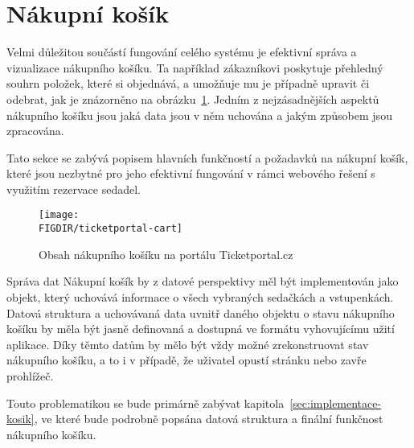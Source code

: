 \section{Nákupní košík}
\label{sec:identifikace-nakupni-kosik}
Velmi důležitou součástí fungování celého systému je efektivní správa a vizualizace nákupního košíku.
Ta například zákazníkovi poskytuje přehledný souhrn položek, které si objednává, a umožňuje mu je případně upravit či odebrat, jak je znázorněno na obrázku~\ref{fig:ticketportal-cart}.
Jedním z nejzásadnějších aspektů nákupního košíku jsou jaká data jsou v něm uchována a jakým způsobem jsou zpracována.

Tato sekce se zabývá popisem hlavních funkčností a požadavků na nákupní košík, které jsou nezbytné pro jeho efektivní fungování v rámci webového řešení s využitím rezervace sedadel.

\begin{figure}[H]
    \texttt{[image: \\FIGDIR/ticketportal-cart]}
    \centering
    \caption{Obsah nákupního košíku na portálu Ticketportal.cz\cite{t__www_ticketportal_cz}}
    \label{fig:ticketportal-cart}
\end{figure}

\begin{subsection}{Správa dat}
    \label{subsec:identifikace-nakupni-kosik-sprava}
    Nákupní košík by z datové perspektivy měl být implementován jako objekt, který uchovává informace o všech vybraných sedačkách a vstupenkách.
    Datová struktura a uchovávaná data uvnitř daného objektu o stavu nákupního košíku by měla být jasně definovaná a dostupná ve formátu vyhovujícímu užití aplikace.
    Díky těmto datům by mělo být vždy možné zrekonstruovat stav nákupního košíku, a to i v případě, že uživatel opustí stránku nebo zavře prohlížeč.

    Touto problematikou se bude primárně zabývat kapitola~\ref{sec:implementace-kosik}, ve které bude podrobně popsána datová struktura a finální funkčnost nákupního košíku.
\end{subsection}

